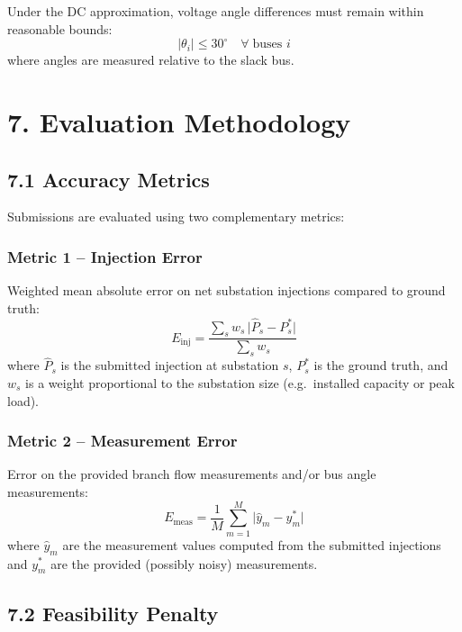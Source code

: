 \documentclass[11pt,a4paper]{article}
\begin{document}
Under the DC approximation, voltage angle differences must remain within reasonable bounds:
%
\begin{equation}
  |\theta_i| \leq 30^{\circ} \quad \forall \; \text{buses } i
\end{equation}
%
where angles are measured relative to the slack bus.

\section{7. Evaluation Methodology}

\subsection{7.1 Accuracy Metrics}

Submissions are evaluated using two complementary metrics:

\subsubsection{Metric 1 -- Injection Error}

Weighted mean absolute error on net substation injections compared to ground truth:
%
\begin{equation}
  E_{\text{inj}} = \frac{\displaystyle\sum_{s} w_s \, \bigl| \hat{P}_s - P_s^* \bigr|}{\displaystyle\sum_{s} w_s}
\end{equation}
%
where $\hat{P}_s$ is the submitted injection at substation $s$, $P_s^*$ is the ground truth, and $w_s$ is a weight proportional to the substation size (e.g.\ installed capacity or peak load).

\subsubsection{Metric 2 -- Measurement Error}

Error on the provided branch flow measurements and/or bus angle measurements:
%
\begin{equation}
  E_{\text{meas}} = \frac{1}{M} \sum_{m=1}^{M} \bigl| \hat{y}_m - y_m^* \bigr|
\end{equation}
%
where $\hat{y}_m$ are the measurement values computed from the submitted injections and $y_m^*$ are the provided (possibly noisy) measurements.

\subsection{7.2 Feasibility Penalty}
\end{document}
